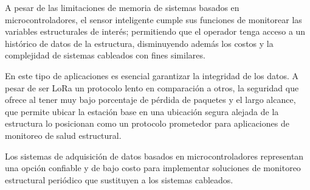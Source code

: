 	A pesar de las limitaciones de memoria de sistemas basados en microcontroladores, el sensor inteligente cumple sus funciones de monitorear las variables estructurales de interés; permitiendo que el operador tenga acceso a un histórico de datos de la estructura, disminuyendo además los costos y la complejidad de sistemas cableados con fines similares.
	
	En este tipo de aplicaciones es esencial garantizar la integridad de los datos.	A pesar de ser LoRa un protocolo lento en comparación a otros, la seguridad que ofrece al tener muy bajo porcentaje de pérdida de paquetes y el largo alcance, que permite ubicar la estación base en una ubicación segura alejada de la estructura lo posicionan como un protocolo prometedor para aplicaciones de monitoreo de salud estructural. 
	
    Los sistemas de adquisición de datos basados en microcontroladores representan una opción confiable y de bajo costo para implementar soluciones de monitoreo estructural periódico que sustituyen a los sistemas cableados.